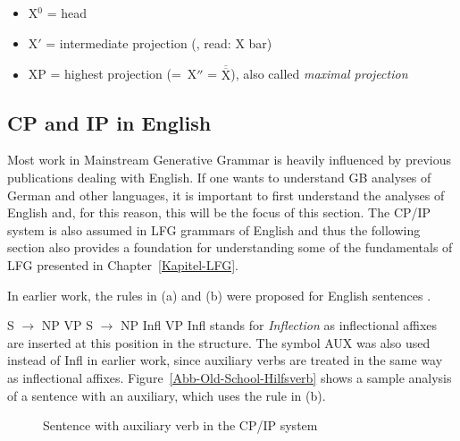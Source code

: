 \begin{itemize}
\item X$^0$ = head
\item X$'$ = intermediate projection (\xbar, read: X bar) 
\item XP = highest projection (=~X$''$ = $\overline{\overline{\mbox{X}}}$), also called \emph{maximal projection} 
\end{itemize}

\subsection{CP and IP in English}
\label{Abschnitt-GB-CP-IP-System-Englisch}\label{sec-GB-CP-IP-System-English}

Most work in Mainstream Generative Grammar is heavily influenced by previous publications dealing with English. If one wants to understand GB analyses of
German and other languages, it is important to first understand the analyses of English and, for this reason, this will be the focus of this section.
The CP/IP system is also assumed in LFG grammars of English and thus the following section also provides a foundation for understanding some of the
fundamentals of LFG presented in Chapter~\ref{Kapitel-LFG}.

In earlier work, the rules in (a) and (b) were proposed for English sentences \citep[]{Chomsky81a}.

\eal
\ex S $\to$ NP VP
\ex S $\to$ NP Infl VP
\zl
%
Infl stands for \emph{Inflection} as inflectional affixes are inserted at this position in the
structure. The symbol AUX was also used instead
of Infl in earlier work, since auxiliary verbs are treated in the same way as inflectional
affixes. Figure~\vref{Abb-Old-School-Hilfsverb} shows a sample 
analysis of a sentence with an auxiliary, which uses the rule in (b). 
%
\begin{figure}
\begin{floatrow}
{\caption{\label{Abb-GB-Hilfsverb}Sentence with auxiliary verb in the CP/IP system}}
\end{floatrow}
\end{figure}%

